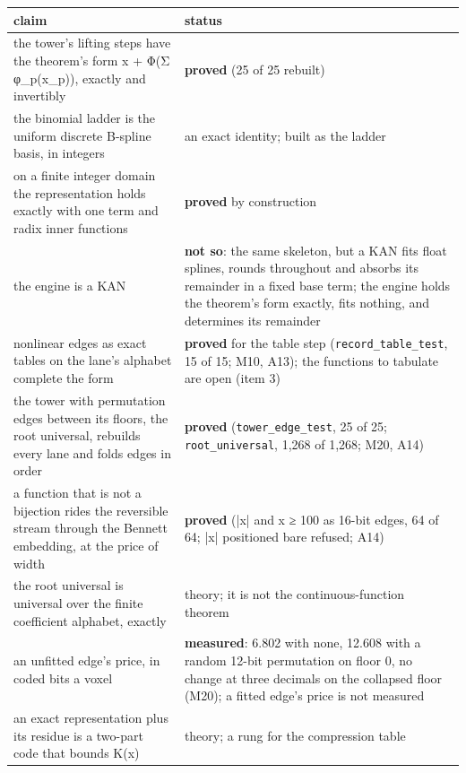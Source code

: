 {\small
\setlength{\tabcolsep}{6pt}
\begin{longtable}{>{\RaggedRight\arraybackslash}p{}>{\RaggedRight\arraybackslash}p{}}
\toprule
claim & status \\
\midrule
\endhead
the tower's lifting steps have the theorem's form x + Φ(Σ φ\_\allowbreak{}p(x\_\allowbreak{}p)), exactly and invertibly & \textbf{proved} (25 of 25 rebuilt) \\
the binomial ladder is the uniform discrete B-spline basis, in integers & an exact identity; built as the ladder \\
on a finite integer domain the representation holds exactly with one term and radix inner functions & \textbf{proved} by construction \\
the engine is a KAN & \textbf{not so}: the same skeleton, but a KAN fits float splines, rounds throughout and absorbs its remainder in a fixed base term; the engine holds the theorem's form exactly, fits nothing, and determines its remainder \\
nonlinear edges as exact tables on the lane's alphabet complete the form & \textbf{proved} for the table step (\texttt{record\_\allowbreak{}table\_\allowbreak{}test}, 15 of 15; M10, A13); the functions to tabulate are open (item 3) \\
the tower with permutation edges between its floors, the root universal, rebuilds every lane and folds edges in order & \textbf{proved} (\texttt{tower\_\allowbreak{}edge\_\allowbreak{}test}, 25 of 25; \texttt{root\_\allowbreak{}universal}, 1,268 of 1,268; M20, A14) \\
a function that is not a bijection rides the reversible stream through the Bennett embedding, at the price of width & \textbf{proved} (|x| and x ≥ 100 as 16-bit edges, 64 of 64; |x| positioned bare refused; A14) \\
the root universal is universal over the finite coefficient alphabet, exactly & theory; it is not the continuous-function theorem \\
an unfitted edge's price, in coded bits a voxel & \textbf{measured}: 6.802 with none, 12.608 with a random 12-bit permutation on floor 0, no change at three decimals on the collapsed floor (M20); a fitted edge's price is not measured \\
an exact representation plus its residue is a two-part code that bounds K(x) & theory; a rung for the compression table \\
\bottomrule
\end{longtable}
}

